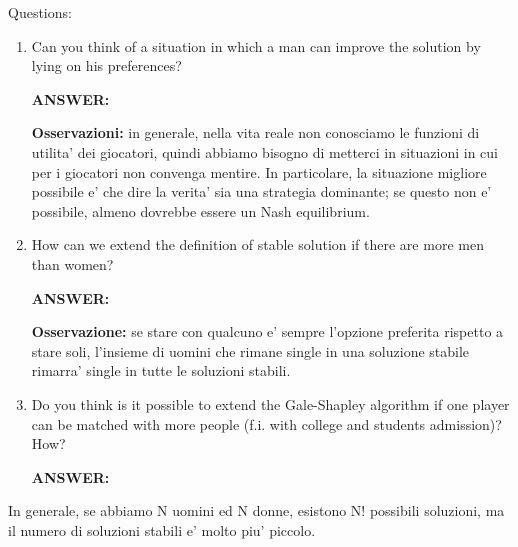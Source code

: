 
%



\noindent Questions:
\begin{enumerate}
	\item Can you think of a situation in which a man can improve 
		the solution by lying on his preferences?

		\noindent \textbf{ANSWER:} 

		\noindent \textbf{Osservazioni:} in generale, nella vita 
		reale non conosciamo le funzioni di utilita' dei giocatori, 
		quindi abbiamo bisogno di metterci in situazioni in cui 
		per i giocatori non convenga mentire. In particolare, la 
		situazione migliore possibile e' che dire la verita' sia una 
		strategia dominante; se questo non e' possibile, almeno 
		dovrebbe essere un Nash equilibrium.

	\item How can we extend the definition of stable solution if there 
		are more men than women?

		\noindent \textbf{ANSWER:} 

		\noindent \textbf{Osservazione:} se stare con qualcuno e' 
		sempre l'opzione preferita rispetto a stare soli, l'insieme 
		di uomini che rimane single in una soluzione stabile 
		rimarra' single in tutte le soluzioni stabili.

	\item Do you think is it possible to extend the Gale-Shapley algorithm 
		if one player can be matched with more people (f.i. with 
		college and students admission)? How?

		\noindent \textbf{ANSWER:}
\end{enumerate}

\noindent In generale, se abbiamo N uomini ed N donne, esistono N! possibili 
soluzioni, ma il numero di soluzioni stabili e' molto piu' piccolo.

%
